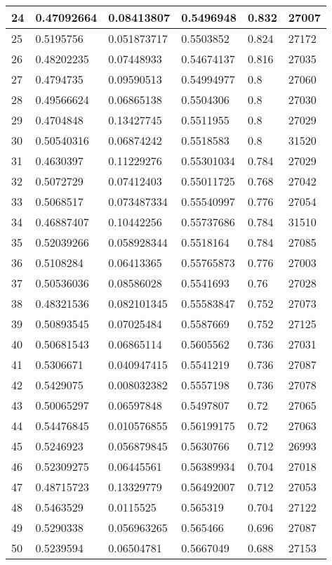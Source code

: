 \begin{longtable}{|l|l|l|l|l|l|}
24 & 0.47092664 & 0.08413807 & 0.5496948 & 0.832 & 27007 \\ \hline 
25 & 0.5195756 & 0.051873717 & 0.5503852 & 0.824 & 27172 \\ \hline 
26 & 0.48202235 & 0.07448933 & 0.54674137 & 0.816 & 27035 \\ \hline 
27 & 0.4794735 & 0.09590513 & 0.54994977 & 0.8 & 27060 \\ \hline 
28 & 0.49566624 & 0.06865138 & 0.5504306 & 0.8 & 27030 \\ \hline 
29 & 0.4704848 & 0.13427745 & 0.5511955 & 0.8 & 27029 \\ \hline 
30 & 0.50540316 & 0.06874242 & 0.5518583 & 0.8 & 31520 \\ \hline 
31 & 0.4630397 & 0.11229276 & 0.55301034 & 0.784 & 27029 \\ \hline 
32 & 0.5072729 & 0.07412403 & 0.55011725 & 0.768 & 27042 \\ \hline 
33 & 0.5068517 & 0.073487334 & 0.55540997 & 0.776 & 27054 \\ \hline 
34 & 0.46887407 & 0.10442256 & 0.55737686 & 0.784 & 31510 \\ \hline 
35 & 0.52039266 & 0.058928344 & 0.5518164 & 0.784 & 27085 \\ \hline 
36 & 0.5108284 & 0.06413365 & 0.55765873 & 0.776 & 27003 \\ \hline 
37 & 0.50536036 & 0.08586028 & 0.5541693 & 0.76 & 27028 \\ \hline 
38 & 0.48321536 & 0.082101345 & 0.55583847 & 0.752 & 27073 \\ \hline 
39 & 0.50893545 & 0.07025484 & 0.5587669 & 0.752 & 27125 \\ \hline 
40 & 0.50681543 & 0.06865114 & 0.5605562 & 0.736 & 27031 \\ \hline 
41 & 0.5306671 & 0.040947415 & 0.5541219 & 0.736 & 27087 \\ \hline 
42 & 0.5429075 & 0.008032382 & 0.5557198 & 0.736 & 27078 \\ \hline 
43 & 0.50065297 & 0.06597848 & 0.5497807 & 0.72 & 27065 \\ \hline 
44 & 0.54476845 & 0.010576855 & 0.56199175 & 0.72 & 27063 \\ \hline 
45 & 0.5246923 & 0.056879845 & 0.5630766 & 0.712 & 26993 \\ \hline 
46 & 0.52309275 & 0.06445561 & 0.56389934 & 0.704 & 27018 \\ \hline 
47 & 0.48715723 & 0.13329779 & 0.56492007 & 0.712 & 27053 \\ \hline 
48 & 0.5463529 & 0.0115525 & 0.565319 & 0.704 & 27122 \\ \hline 
49 & 0.5290338 & 0.056963265 & 0.565466 & 0.696 & 27087 \\ \hline 
50 & 0.5239594 & 0.06504781 & 0.5667049 & 0.688 & 27153 \\ \hline 
\end{longtable}